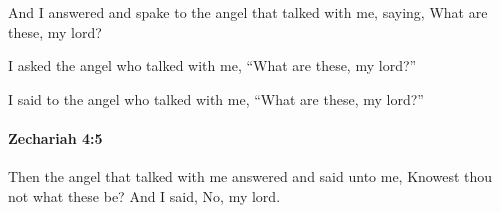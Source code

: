 			\begin{versebox}
					\item[BHS] 
					\item[LXX] 
					\item[ASV] And I answered and spake to the angel that talked with me, saying, What are these, my lord?
					\item[NIV] I asked the angel who talked with me, “What are these, my lord?”
					\item[NRSV] I said to the angel who talked with me, “What are these, my lord?”
			\end{versebox}

		\paragraph{Zechariah 4:5} %
			\label{ZECHARIAH-4-5}

			Then the angel that talked with me answered and said unto me, Knowest thou not what these be? And I said, No, my lord.

